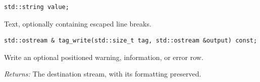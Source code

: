 \par\noindent\begin{minipage}{\linewidth}
\begin{lstlisting}[style=apireference]
std::string value;
\end{lstlisting}
{\footnotesize Text, optionally containing escaped line breaks.\par}
\end{minipage}\par\vspace{1pt}
\par\noindent\begin{minipage}{\linewidth}
\begin{lstlisting}[style=apireference]
std::ostream & tag_write(std::size_t tag, std::ostream &output) const;
\end{lstlisting}
{\footnotesize Write an optional positioned warning, information, or error row.\par}
{\footnotesize\textit{Returns:} The destination stream, with its formatting preserved.\par}
\end{minipage}\par\vspace{1pt}
